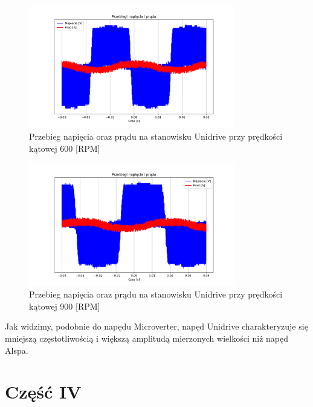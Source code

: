 \documentclass[11pt]{article}
\begin{document}
\begin{figure}[H]
\centering
\includegraphics[width=0.8\textwidth]{aun1_unidrive_rpm600.pdf}
\caption{Przebieg napięcia oraz prądu na stanowisku Unidrive przy prędkości kątowej 600 [RPM]}
\end{figure}

\begin{figure}[H]
\centering
\includegraphics[width=0.8\textwidth]{aun1_unidrive_rpm900.pdf}
\caption{Przebieg napięcia oraz prądu na stanowisku Unidrive przy prędkości kątowej 900 [RPM]}
\end{figure}

Jak widzimy, podobnie do napędu Microverter, napęd Unidrive charakteryzuje się mniejszą częstotliwością i większą amplitudą mierzonych wielkości niż napęd Alspa.\\

\section{Część IV}
\end{document}
